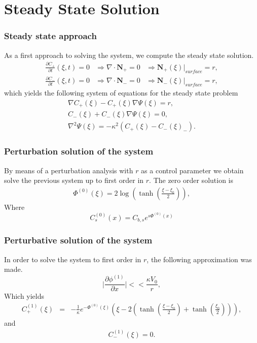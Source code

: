 \documentclass{beamer}
\newcommand{\qty}[1]
{
	\left({#1}\right)
}
\begin{document}
\section{Steady State Solution}


\begin{frame}
\frametitle{Steady state approach}
As a first approach to solving the system, we compute the steady state solution.
\begin{align}
\frac{\partial C_+}{\partial t}(\xi,t)  = 0 &\Rightarrow \nabla \cdot\mathbf{N}_+ = 0& \Rightarrow \mathbf{N}_+(\xi)\big|_{surface} = r,  \\
\frac{\partial C_-}{\partial t}(\xi,t) = 0   &\Rightarrow \nabla \cdot\mathbf{N}_- = 0& \Rightarrow \mathbf{N}_-(\xi)\big|_{surface} = r, 
\label{eq:border}
\end{align}
which yields the following system of equations for the steady state problem
\begin{align}
\nabla C_+(\xi) - C_+(\xi) \nabla \Psi(\xi) = r, \\
C_-(\xi) +  C_-(\xi) \nabla \Psi(\xi) = 0, \\
\nabla^2 \Psi(\xi) = -\kappa^2 \left(C_+(\xi) - C_-(\xi)_-\right).
\end{align}
\end{frame}


\begin{frame}
\frametitle{Perturbation solution of the system}
By means of a perturbation analysis with $r$ as a control parameter we obtain solve the previous system up to first order in $r$. The zero order solution is
\begin{align}
\Phi^{(0)}(\xi) =  2\log{\qty{\tanh\qty{\frac{\xi-\xi_0}{2}}}},
\end{align}
Where
$$C^{(0)}_s(x)=C_{b,s}e^{s\Phi^{(0)}(x)}$$

\end{frame}

\begin{frame}
\frametitle{Perturbative solution of the system}
In order to solve the system to first order in $r$, the following approximation was made.
\begin{equation}
\bigg|\frac{\partial \phi^{(1)}}{\partial x}\bigg| << \frac{\kappa V_0}{r},
\end{equation}
Which yields
\begin{align}
C^{(1)}_+(\xi) &=& -\frac{1}{\kappa} e^{-\Phi^{(0)}(\xi)}\left(\xi-2\qty{\tanh\qty{\frac{\xi-\xi_0}{2}} + \tanh\qty{\frac{\xi_0}{2}}}\right)\nonumber,
\end{align}
and
\begin{align}
C^{(1)}_-(\xi) = 0.
\end{align}

\end{frame}
\end{document}
